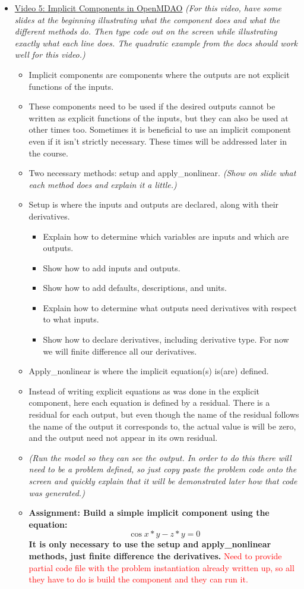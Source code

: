 \documentclass[12pt, letterpaper]{article}
\begin{document}
\begin{itemize}
	\item \underline{Video 5: Implicit Components in OpenMDAO} \textit{(For this video, have some slides at the beginning illustrating what the 				component does and what the different methods do. Then type code out on the screen while illustrating exactly what each line does. The 					quadratic example from the docs should work well for this video.)}
		\begin{itemize}
			\item Implicit components are components where the outputs are not explicit functions of the inputs.
			\item These components need to be used if the desired outputs cannot be written as explicit functions of the inputs, but they can also be 					used at other times too. Sometimes it is beneficial to use an implicit component even if it isn't strictly necessary. These times will be addressed later in the course.
			\item Two necessary methods: setup and apply\_nonlinear. \textit{(Show on slide what each method does and explain it a little.)}
			\item Setup is where the inputs and outputs are declared, along with their derivatives.
				\begin{itemize}
					\item Explain how to determine which variables are inputs and which are outputs.
					\item Show how to add inputs and outputs.
					\item Show how to add defaults, descriptions, and units.
					\item Explain how to determine what outputs need derivatives with respect to what inputs.
					\item Show how to declare derivatives, including derivative type. For now we will finite difference all our derivatives.
				\end{itemize}
			\item Apply\_nonlinear is where the implicit equation(s) is(are) defined. 
			\item Instead of writing explicit equations as was done in the explicit component, here each equation is defined by a residual. There is a 					residual for each output, but even though the name of the residual follows the name of the output it corresponds to, the actual value is will be zero, and the output need not appear in its own residual.
			\item \textit{(Run the model so they can see the output. In order to do this there will need to be a problem defined, so just copy paste the 				problem code onto the screen and quickly explain that it will be demonstrated later how that code was generated.)}
			\item \textbf{Assignment: Build a simple implicit component using the equation: $$ \cos{x*y}-z*y=0 $$ It is only necessary to use the setup 			and apply\_nonlinear methods, just finite difference the derivatives.} \textcolor{red}{Need to provide partial code file with the problem instantiation already written up, so all they have to do is build the component and they can run it.}
		\end{itemize}


\end{itemize}
\end{document}
